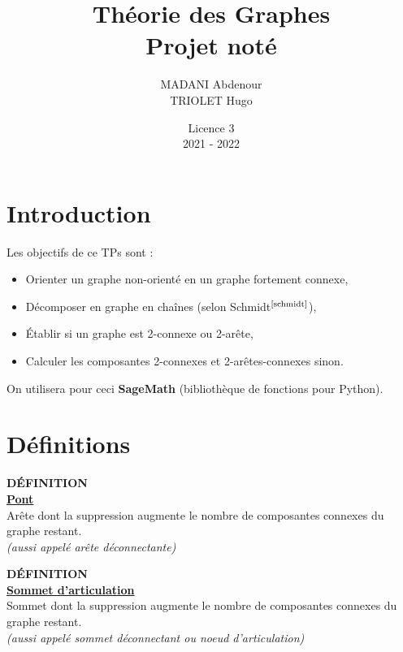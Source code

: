 \documentclass{article}      %
\title{Théorie des Graphes\\\Large{Projet noté}}
\author{MADANI Abdenour\\TRIOLET Hugo}
\date{Licence 3\\2021 - 2022}
\begin{document}
\normalsize
\maketitle

\renewcommand*\contentsname{Table des matières}
\tableofcontents
\newpage



\section{Introduction}
Les objectifs de ce TPs sont :
\begin{itemize}
  \item Orienter un graphe non-orienté en un graphe fortement connexe,
  \item Décomposer en graphe en chaînes (selon Schmidt$^\text{\cite{schmidt}}$),
  \item Établir si un graphe est 2-connexe ou 2-arête,
  \item Calculer les composantes 2-connexes et 2-arêtes-connexes sinon.
\end{itemize}

On utilisera pour ceci \textbf{SageMath} (bibliothèque de fonctions pour Python).



\section{Définitions}
\begin{definition}
{ \scriptsize \textcolor{definition}{ \textbf{DÉFINITION}}}
\vspace{3px}
\\ \underline{\textbf{Pont}}
\vspace{2.5px}
\\ Arête dont la suppression augmente le nombre de composantes connexes du graphe restant.%
\\ \textit{(aussi appelé arête déconnectante)}
\end{definition}

\begin{definition}
{ \scriptsize \textcolor{definition}{ \textbf{DÉFINITION}}}
\vspace{3px}
\\ \underline{\textbf{Sommet d'articulation}}
\vspace{2.5px}
\\ Sommet dont la suppression augmente le nombre de composantes connexes du graphe restant.%
\\ \textit{(aussi appelé sommet déconnectant ou noeud d'articulation)}
\end{definition}
\end{document}

